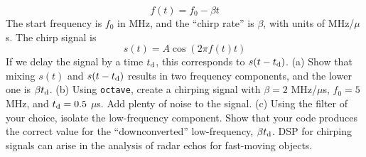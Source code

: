 \documentclass{article}
\begin{document}
\begin{enumerate}
\begin{equation}
f(t) = f_0 - \beta t
\end{equation}
The start frequency is $f_0$ in MHz, and the ``chirp rate'' is $\beta$, with units of MHz/$\mu$s.  The chirp signal is
\begin{equation}
s(t) = A\cos\left(2\pi f(t)t\right)
\end{equation}
If we delay the signal by a time $t_{\rm d}$, this corresponds to $s(t-t_{\rm d})$. (a) Show that mixing $s(t)$ and $s(t-t_{\rm d})$ results in two frequency components, and the lower one is $\beta t_{\rm d}$. (b) Using \verb+octave+, create a chirping signal with $\beta = 2$ MHz/$\mu$s, $f_0 = 5$ MHz, and $t_{\rm d} = 0.5$ $\mu$s. Add plenty of noise to the signal.  (c) Using the filter of your choice, isolate the low-frequency component.  Show that your code produces the correct value for the ``downconverted'' low-frequency, $\beta t_{\rm d}$.  DSP for chirping signals can arise in the analysis of radar echos for fast-moving objects.
\end{enumerate}
\end{document}
